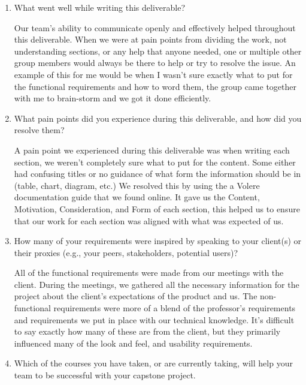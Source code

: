 \begin{enumerate}
 \item What went well while writing this deliverable?

    \par{Our team’s ability to communicate openly and effectively helped throughout this deliverable. When we were at pain points from dividing the work, not understanding sections, or any help that anyone needed, one or multiple other group members would always be there to help or try to resolve the issue. An example of this for me would be when I wasn’t sure exactly what to put for the functional requirements and how to word them, the group came together with me to brain-storm and we got it done efficiently.}
  
  \item What pain points did you experience during this deliverable, and how did you resolve them?

    \par{A pain point we experienced during this deliverable was when writing each section, we weren’t completely sure what to put for the content. Some either had confusing titles or no guidance of what form the information should be in (table, chart, diagram, etc.) We resolved this by using the a Volere documentation guide that we found online. It gave us the Content, Motivation, Consideration, and Form of each section, this helped us to ensure that our work for each section was aligned with what was expected of us.}

  \item How many of your requirements were inspired by speaking to your client(s) or their proxies (e.g., your peers, stakeholders, potential users)?

    \par{All of the functional requirements were made from our meetings with the client. During the meetings, we gathered all the necessary information for the project about the client’s expectations of the product and us. The non-functional requirements were more of a blend of the professor’s requirements and requirements we put in place with our technical knowledge. It’s difficult to say exactly how many of these are from the client, but they primarily influenced many of the look and feel, and usability requirements.}

  \item Which of the courses you have taken, or are currently taking, will help
  your team to be successful with your capstone project.


\end{enumerate}
